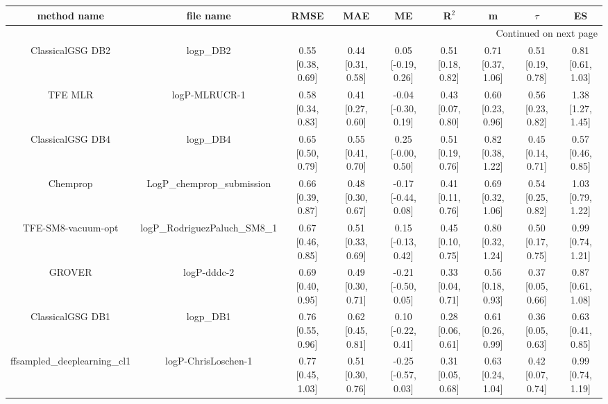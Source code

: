 \documentclass{article}
\begin{document}
\begin{center}
\scriptsize
\begin{longtable}{|ccccccccc|}
\toprule
                  method name &                                      file name &               RMSE &                MAE &                    ME &              R$^2$ &                     m &                $\tau$ &                    ES \\
\midrule
\endhead
\midrule
\multicolumn{9}{r}{{Continued on next page}} \\
\midrule
\endfoot

\bottomrule
\endlastfoot
             ClassicalGSG DB2 &                                      logp\_DB2 &  0.55 [0.38, 0.69] &  0.44 [0.31, 0.58] &    0.05 [-0.19, 0.26] &  0.51 [0.18, 0.82] &     0.71 [0.37, 1.06] &     0.51 [0.19, 0.78] &     0.81 [0.61, 1.03] \\
                      TFE MLR &                                  logP-MLRUCR-1 &  0.58 [0.34, 0.83] &  0.41 [0.27, 0.60] &   -0.04 [-0.30, 0.19] &  0.43 [0.07, 0.80] &     0.60 [0.23, 0.96] &     0.56 [0.23, 0.82] &     1.38 [1.27, 1.45] \\
             ClassicalGSG DB4 &                                      logp\_DB4 &  0.65 [0.50, 0.79] &  0.55 [0.41, 0.70] &    0.25 [-0.00, 0.50] &  0.51 [0.19, 0.76] &     0.82 [0.38, 1.22] &     0.45 [0.14, 0.71] &     0.57 [0.46, 0.85] \\
                     Chemprop &                     LogP\_chemprop\_submission &  0.66 [0.39, 0.87] &  0.48 [0.30, 0.67] &   -0.17 [-0.44, 0.08] &  0.41 [0.11, 0.76] &     0.69 [0.32, 1.06] &     0.54 [0.25, 0.82] &     1.03 [0.79, 1.22] \\
           TFE-SM8-vacuum-opt &                  logP\_RodriguezPaluch\_SM8\_1 &  0.67 [0.46, 0.85] &  0.51 [0.33, 0.69] &    0.15 [-0.13, 0.42] &  0.45 [0.10, 0.75] &     0.80 [0.32, 1.24] &     0.50 [0.17, 0.75] &     0.99 [0.74, 1.21] \\
                       GROVER &                                    logP-dddc-2 &  0.69 [0.40, 0.95] &  0.49 [0.30, 0.71] &   -0.21 [-0.50, 0.05] &  0.33 [0.04, 0.71] &     0.56 [0.18, 0.93] &     0.37 [0.05, 0.66] &     0.87 [0.61, 1.08] \\
             ClassicalGSG DB1 &                                      logp\_DB1 &  0.76 [0.55, 0.96] &  0.62 [0.45, 0.81] &    0.10 [-0.22, 0.41] &  0.28 [0.06, 0.61] &     0.61 [0.26, 0.99] &     0.36 [0.05, 0.63] &     0.63 [0.41, 0.85] \\
   ffsampled_deeplearning_cl1 &                            logP-ChrisLoschen-1 &  0.77 [0.45, 1.03] &  0.51 [0.30, 0.76] &   -0.25 [-0.57, 0.03] &  0.31 [0.05, 0.68] &     0.63 [0.24, 1.04] &     0.42 [0.07, 0.74] &     0.99 [0.74, 1.19] \\

\end{longtable}
\end{center}
\end{document}

